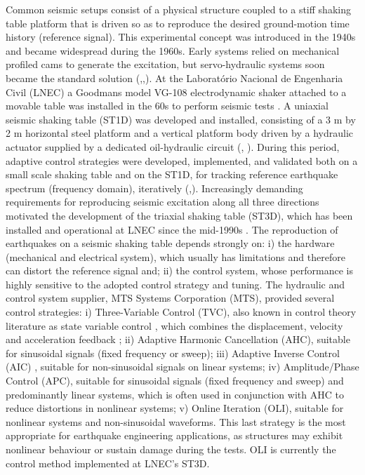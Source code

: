 \documentclass[ 10pt, twocolumn]{article} %
\begin{document}
Common seismic setups consist of a physical structure coupled to a stiff shaking table platform that is driven so as to reproduce the desired ground-motion time history (reference signal). This experimental concept was introduced in the 1940s and became widespread during the 1960s. Early systems relied on mechanical profiled cams to generate the excitation, but servo-hydraulic systems soon became the standard solution (\cite{williams2001},\cite{carvalho1998},\cite{candeias2023}). At the Laboratório Nacional de Engenharia Civil (LNEC) a Goodmans model VG-108 electrodynamic shaker attached to a movable table was installed in the 60s to perform seismic tests \cite{emilio1989}. A uniaxial seismic shaking table (ST1D) was developed and installed, consisting of a 3 m by 2 m horizontal steel platform and a vertical platform body driven by a hydraulic actuator supplied by a dedicated oil-hydraulic circuit (\cite{bairao1998}, \cite{castro1978}). During this period, adaptive control strategies were developed, implemented, and validated both on a small scale shaking table and on the ST1D, for tracking reference earthquake spectrum (frequency domain), iteratively (\cite{carvalhal1974},\cite{carvalhal1979}). Increasingly demanding requirements for reproducing seismic excitation along all three directions motivated the development of the triaxial shaking table (ST3D), which has been installed and operational at LNEC since the mid-1990s \cite{emilio1989}. The reproduction of earthquakes on a seismic shaking table depends strongly on: i) the hardware (mechanical and electrical system), which usually has limitations and therefore can distort the reference signal and; ii) the control system, whose performance is highly sensitive to the adopted control strategy and tuning. The hydraulic and control system supplier, MTS Systems Corporation (MTS), provided several control strategies: i) Three-Variable Control (TVC), also known in control theory literature as state variable control \cite{ogata2010}, which combines the displacement, velocity and acceleration feedback \cite{williams2001}; ii) Adaptive Harmonic Cancellation (AHC), suitable for sinusoidal signals (fixed frequency or sweep); iii) Adaptive Inverse Control (AIC) \cite{widrow2007}, suitable for non-sinusoidal signals on linear systems; iv) Amplitude/Phase Control (APC), suitable for sinusoidal signals (fixed frequency and sweep) and predominantly linear systems, which is often used in conjunction with AHC to reduce distortions in nonlinear systems; v) Online Iteration (OLI), suitable for nonlinear systems and non-sinusoidal waveforms. This last strategy is the most appropriate for earthquake engineering applications, as structures may exhibit nonlinear behaviour or sustain damage during the tests. OLI is currently the control method implemented at LNEC's ST3D.
\end{document}
